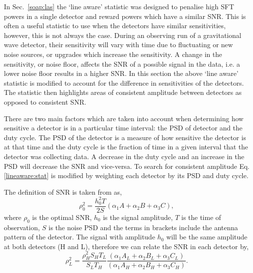 In Sec.~\ref{soap:las} the `line aware' statistic was designed to penalise high
\gls{SFT} powers in a single detector and reward powers which have a similar
\gls{SNR}. This is often a useful statistic to use when the detectors have
similar sensitivities, however, this is not always the case. During an
observing run of a gravitational wave detector, their sensitivity will vary
with time due to fluctuating or new noise sources, or upgrades which increase the sensitivity. 
A change in the sensitivity, or noise floor,
affects the \gls{SNR} of a possible signal in the data, i.e. a lower noise
floor results in a higher \gls{SNR}.  In this section the above `line aware'
statistic is modified to account for the difference in sensitivities of the
detectors.
The statistic then highlights areas of consistent amplitude between detectors as
opposed to consistent \gls{SNR}.

There are two main factors which are taken into account when determining how
sensitive a detector is in a particular time interval: the \gls{PSD} of
detector and the duty cycle. The \gls{PSD} of the detector is a measure of how
sensitive the detector is at that time and the duty cycle is the fraction of
time in a given interval that the detector was collecting data. A decrease in
the duty cycle and an increase in the \gls{PSD} will decrease the \gls{SNR} and
vice-versa. To search for consistent amplitude Eq.\ref{lineaware:stat} is
modified by weighting each detector by its \gls{PSD} and duty cycle.

The definition of \gls{SNR} is taken from \citep{prix2007SearchContinuous} as, 
\begin{equation}
    \rho_0^2 = \frac{h_0^2 T}{2 S}(\alpha_1A + \alpha_2B + \alpha_3C),
\end{equation}
where $\rho_0$ is the optimal \gls{SNR}, $h_0$ is the signal amplitude, $T$ is
the time of observation, $S$ is the noise \gls{PSD} and the terms in brackets include the antenna pattern of the detector. 
The signal with amplitude $h_0$ will be the same amplitude at both detectors (H and L), therefore we can relate the \gls{SNR} in each detector by,
\begin{equation}
\label{lineawareamp:snrequate}
    \rho_L^2 = \frac{\rho_H^2 S_H T_L}{S_L T_H} \frac{(\alpha_1A_L + \alpha_2B_L + \alpha_3C_L)}{(\alpha_1A_H + \alpha_2B_H + \alpha_3C_H)} .
\end{equation}

